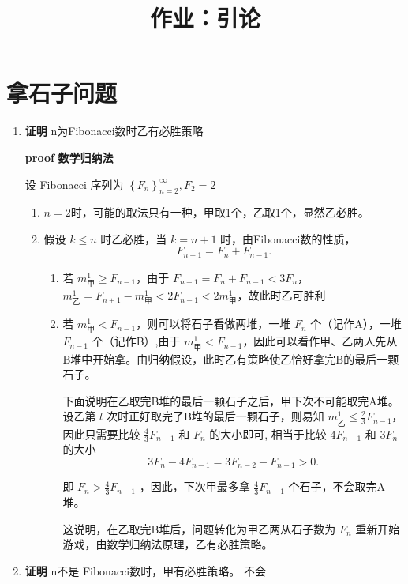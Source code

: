 \documentclass[UTF8]{ctexart}
\begin{document}
\title{作业：引论}
\maketitle
\section{拿石子问题}%
\label{sec:拿石子问题}

\begin{enumerate}
    \item \textbf{证明} n为Fibonacci数时乙有必胜策略

\textbf{proof} \textbf{数学归纳法} 

设 Fibonacci 序列为 $\left\{ F_n \right\} _{n=2} ^{\infty}, F_2 = 2$ 
\begin{enumerate}
    \item $n=2$时，可能的取法只有一种，甲取1个，乙取1个，显然乙必胜。

    \item 假设 $k\le n$ 时乙必胜，当 $k=n+1$ 时，由Fibonacci数的性质， \[
    F _{n+1} = F_n + F _{n-1}
    .\] 

    \begin{enumerate}
        \item 若 $m _{\text{甲}}^{1} \ge F _{n-1}$，由于 $F _{n+1} = F_n + F _{n-1} < 3 F_n$，$m _{\text{乙}} ^{1} = F _{n+1} - m _{\text{甲}} ^{1} < 2 F _{n-1} < 2 m _{\text{甲}} ^{1}$，故此时乙可胜利
        \item 若 $m _{\text{甲}}^{1} < F _{n-1}$，则可以将石子看做两堆，一堆 $F_n$ 个（记作A），一堆  $F _{n-1}$ 个（记作B）,由于 $m _{\text{甲}} ^{1} < F _{n-1}$，因此可以看作甲、乙两人先从B堆中开始拿。由归纳假设，此时乙有策略使乙恰好拿完B的最后一颗石子。


            下面说明在乙取完B堆的最后一颗石子之后，甲下次不可能取完A堆。设乙第 $ l $ 次时正好取完了B堆的最后一颗石子，则易知 $m _{\text{乙}} ^{1} \le \frac{2}{3} F_{n-1}$，因此只需要比较 $ \frac{4}{3} F_{n-1} $ 和 $ F_{n} $ 的大小即可, 相当于比较 $ 4 F_{n-1} $ 和 $ 3 F_{n} $ 的大小 \[
                3 F_{n} - 4 F_{n-1} =  3 F_{n-2} - F_{n-1} > 0
            .\] 

        即 $ F_n > \frac{4}{3} F_{n-1}$ ，因此，下次甲最多拿 $ \frac{4}{3} F_{n-1} $ 个石子，不会取完A堆。


        这说明，在乙取完B堆后，问题转化为甲乙两从石子数为 $ F_{n} $ 重新开始游戏，由数学归纳法原理，乙有必胜策略。

        \end{enumerate}
    \end{enumerate}


\item \textbf{证明} n不是 Fibonacci数时，甲有必胜策略。
    不会
\end{enumerate}
\end{document}
